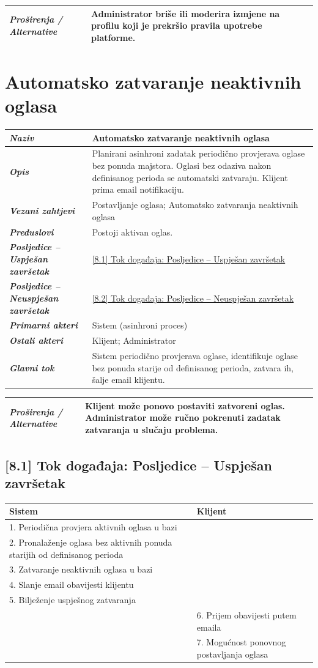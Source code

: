 \documentclass[12pt,a4paper]{article}
\newcommand{\usecase}[9]{%
\begin{longtable}{|L{4cm}|L{11cm}|}
\hline
\textbf{\textit{Naziv}} & \textbf{#1} \\
\hline
\textbf{\textit{Opis}} & #2 \\
\hline
\textbf{\textit{Vezani zahtjevi}} & #3 \\
\hline
\textbf{\textit{Preduslovi}} & #4 \\
\hline
\textbf{\textit{Posljedice -- Uspješan završetak}} & #5 \\
\hline
\textbf{\textit{Posljedice -- Neuspješan završetak}} & #6 \\
\hline
\textbf{\textit{Primarni akteri}} & #7 \\
\hline
\textbf{\textit{Ostali akteri}} & #8 \\
\hline
\textbf{\textit{Glavni tok}} & #9 \\
\hline
\end{longtable}%
}
\newcommand{\extensions}[1]{%
\vspace{-1.5em}
\begin{longtable}{|L{4cm}|L{11cm}|}
\hline
\textbf{\textit{Proširenja / Alternative}} & #1 \\
\hline
\end{longtable}%
}
\begin{document}
\extensions{Administrator briše ili moderira izmjene na profilu koji je prekršio pravila upotrebe platforme.}



\section{Automatsko zatvaranje neaktivnih oglasa}

\usecase
{Automatsko zatvaranje neaktivnih oglasa}
{Planirani asinhroni zadatak periodično provjerava oglase bez ponuda majstora. Oglasi bez odaziva nakon definisanog perioda se automatski zatvaraju. Klijent prima email notifikaciju.}
{Postavljanje oglasa; Automatsko zatvaranja neaktivnih oglasa}
{Postoji aktivan oglas.}
{\hyperref[tok:8.1]{[8.1] Tok događaja: Posljedice -- Uspješan završetak}}
{\hyperref[tok:8.2]{[8.2] Tok događaja: Posljedice -- Neuspješan završetak}}
{Sistem (asinhroni proces)}
{Klijent; Administrator}
{Sistem periodično provjerava oglase, identifikuje oglase bez ponuda starije od definisanog perioda, zatvara ih, šalje email klijentu.}

\extensions{Klijent može ponovo postaviti zatvoreni oglas.
    Administrator može ručno pokrenuti zadatak zatvaranja u slučaju problema.}
\pagebreak
\subsection{[8.1] Tok događaja: Posljedice -- Uspješan završetak}
\label{tok:8.1}

\begin{longtable}{|L{7.5cm}|L{7.5cm}|}
    \hline
    \textbf{Sistem}                                                            & \textbf{Klijent}                          \\
    . Periodična provjera aktivnih oglasa u bazi                              &                                           \\
    . Pronalaženje oglasa bez aktivnih ponuda starijih od definisanog perioda &                                           \\
    . Zatvaranje neaktivnih oglasa u bazi                                     &                                           \\
    . Slanje email obavijesti klijentu                                        &                                           \\
    . Bilježenje uspješnog zatvaranja                                         &                                           \\
    \hline
                                                                               & 6. Prijem obavijesti putem emaila         \\
    \hline
                                                                               & 7. Mogućnost ponovnog postavljanja oglasa \\
    \hline
\end{longtable}
\end{document}
